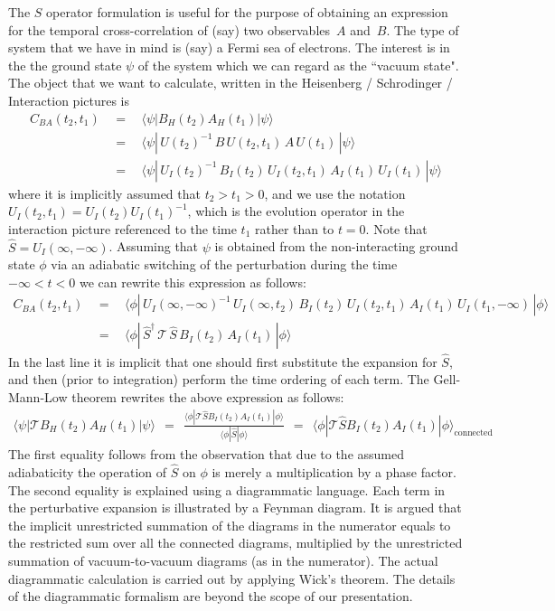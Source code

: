 \documentclass[onecolumn,fleqn]{revtex4}
\newcommand{\tbox}[1]{\text{#1}}
\newcommand{\beq}{\begin{eqnarray}}
\newcommand{\eeq}{\end{eqnarray}}
\begin{document}
The $S$ operator formulation is useful 
for the purpose of obtaining an expression for 
the temporal cross-correlation of (say) two observables~$A$ and~$B$.
The type of system that we have in mind is (say) a Fermi sea 
of electrons. The interest is in the the ground state $\psi$   
of the system which we can regard as the ``vacuum state". 
The object that we want to calculate, written in the 
Heisenberg / Schrodinger / Interaction pictures is   
\beq
C_{BA}(t_2,t_1) 
& \ \ = \ \ & 
\langle\psi|B_H(t_2)A_H(t_1)|\psi\rangle 
\\
& \ \ = \ \ &
\langle\psi| \, U(t_2)^{-1} \, B \, U(t_2,t_1) \, A \, U(t_1) \, |\psi\rangle 
\\
& \ \ = \ \ &
\langle\psi| \, U_I(t_2)^{-1} \, B_I(t_2) \, U_I(t_2,t_1) \, A_I(t_1) \, U_I(t_1) \, |\psi\rangle 
\eeq
where it is implicitly assumed that ${t_2 > t_1 > 0}$, 
and we use the notation ${U_I(t_2,t_1)=U_I(t_2)U_I(t_1)^{-1}}$, 
which is the evolution operator  in the interaction picture
referenced to the time $t_1$ rather than to $t{=}0$. 
Note that ${\hat{S}=U_I(\infty,-\infty)}$.
Assuming that $\psi$ is obtained from the non-interacting 
ground state $\phi$ via an adiabatic switching 
of the perturbation during the time ${-\infty < t < 0}$ 
we can rewrite this expression as follows:   
\beq
C_{BA}(t_2,t_1) 
& \ \ = \ \ &
\langle\phi| \, U_I(\infty,-\infty)^{-1} \, U_I(\infty,t_2)   \, B_I(t_2) \, U_I(t_2,t_1) \, A_I(t_1) \, U_I(t_1,-\infty) \, |\phi\rangle
\\
& \ \ = \ \ &
\langle\phi| \, \hat{S}^{\dag} \, \mathcal{T} \, \hat{S} \, B_I(t_2) \, A_I(t_1) \, |\phi\rangle 
\eeq
In the last line it is implicit that 
one should first substitute the expansion for $\hat{S}$,  
and then (prior to integration) perform 
the time ordering of each term.
The Gell-Mann-Low theorem rewrites the 
above expression as follows:  
\beq
\langle\psi|\mathcal{T}B_H(t_2)A_H(t_1)|\psi\rangle 
\ \ = \ \ 
\frac{\langle\phi|\mathcal{T} \hat{S} B_I(t_2) A_I(t_1) |\phi\rangle} 
{\langle\phi| \hat{S} |\phi\rangle} 
\ \ = \ \ 
\langle\phi|\mathcal{T} \hat{S} B_I(t_2) A_I(t_1) |\phi\rangle_{\tbox{connected}}
\eeq
The first equality follows from the observation 
that due to the assumed adiabaticity 
the operation of $\hat{S}$ on $\phi$ 
is merely a multiplication by a phase factor. 
The second equality is explained using a diagrammatic   
language. Each term in the perturbative expansion 
is illustrated by a Feynman diagram. 
It is argued that the implicit unrestricted summation 
of the diagrams in the numerator equals to 
the restricted sum over all the connected diagrams, 
multiplied by the unrestricted summation of 
vacuum-to-vacuum diagrams (as in the numerator). 
The actual diagrammatic calculation is carried out 
by applying Wick's theorem. The details of the 
diagrammatic formalism are beyond the scope of our presentation.  
\end{document}
